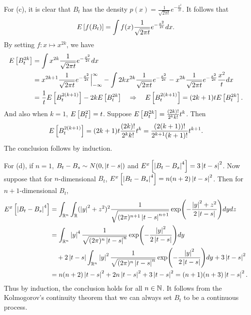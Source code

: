 \begin{solution}
    For (c), it is clear that $B_t$ has the density $p(x) = \frac{1}{\sqrt{2\pi t}} e^{-\frac{x^2}{2t}}$.
    It follows that 
    \begin{equation*}
        E\left[ {f(B_t)} \right] = \int f(x)\frac{1}{\sqrt{2\pi t}} e^{-\frac{x^2}{2t}}dx. 
    \end{equation*}
    By setting $f:x\mapsto x^{2k}$, we have
    \begin{equation*}
        \begin{split}
            E\left[ {B_t^{2k}} \right] &= \int x^{2k}\frac{1}{\sqrt{2\pi t}} e^{-\frac{x^2}{2t}}dx \\
            &= x^{2k+1}\frac{1}{\sqrt{2\pi t}}e^{-\frac{x^2}{2t}}\Big|_{-\infty}^\infty 
            - \int 2kx^{2k}\frac{1}{\sqrt{2\pi t}}e^{-\frac{x^2}{2t}} - x^{2k}\frac{1}{\sqrt{2\pi t}}e^{-\frac{x^2}{2t}}\frac{x^2}{t}dx \\
            &= \frac{1}{t}E\left[ {B_t^{2(k+1)}} \right] - 2kE\left[ {B_t^{2k}} \right]
            \quad\Rightarrow\quad 
            E\left[ {B_t^{2(k+1)}} \right] = (2k+1)tE\left[ {B_t^{2k}} \right].
        \end{split}
    \end{equation*}
    And also when $k = 1$, $E\left[ {B_t^2} \right] = t$. Suppose $E\left[ {B_t^{2k}} \right] = 
    \frac{(2k)!}{2^k k!}t^k$. Then 
    \begin{equation*}
        E\left[ {B_t^{2(k+1)}} \right] = (2k+1)t\frac{(2k)!}{2^k k!}t^k 
        = \frac{(2(k+1))!}{2^{k+1}(k+1)!}t^{k+1}. 
    \end{equation*}
    The conclusion follows by induction. 

    For (d), if $n = 1$, $B_t - B_s\sim N(0, \left\lvert {t-s} \right\rvert)$ and $E^x\left[ {\left\lvert {B_t - B_s} \right\rvert^4} \right] = 3\left\lvert {t-s} \right\rvert^2$.  
    Now suppose that for $n$-dimensional $B_t$, $E^x\left[ {\left\lvert {B_t-B_s} \right\rvert^4} \right] = n(n+2)\left\lvert {t-s} \right\rvert^2$. 
    Then for $n+1$-dimensional $B_t$,
    \begin{equation*}
        \begin{split}
            E^x\sbrc{\abs{B_t-B_s}^4} &= \int_{\R^n}\int_{\R}(\abs{y}^2 + z^2)^2\frac{1}{\sqrt{(2\pi)^{n+1}\abs{t-s}^{n+1}}}\exp\pth{-\frac{\abs{y}^2 + z^2}{2\abs{t-s}}} dy dz \\ 
            &= \int_{\R^n}\abs{y}^4\frac{1}{\sqrt{(2\pi)^n\abs{t-s}^n}}\exp\pth{-\frac{\abs{y}^2}{2\abs{t-s}}} dy \\
            &\quad+ 2\abs{t-s}\int_{\R^n} \abs{y}^2\frac{1}{\sqrt{(2\pi)^n\abs{t-s}^n}}\exp\pth{-\frac{\abs{y}^2}{2\abs{t-s}}} dy 
            + 3\abs{t-s}^2 \\ 
            &= n(n+2)\abs{t-s}^2 + 2n\abs{t-s}^2 + 3\abs{t-s}^2 = (n+1)(n+3)\abs{t-s}^2.
        \end{split}
    \end{equation*}
    Thus by induction, the conclusion holds for all $n\in\mathbb{N}$. It follows from 
    the Kolmogorov's continuity theorem that we can always set $B_t$ to be a 
    continuous process. 
\end{solution}

